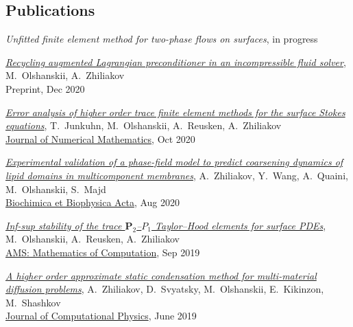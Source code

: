 \documentclass[a4paper,12pt]{article}
\begin{document}
	\subsection*{Publications}
	
	\begin{etaremune}[topsep=0pt]
		\item \textit{Unfitted finite element method for two-phase flows on surfaces}, in progress
		\item \textit{\href{https://arxiv.org/abs/2012.10073}{Recycling augmented Lagrangian preconditioner in an incompressible fluid solver}}, M.~Olshanskii, A.~Zhiliakov\\
		Preprint, Dec 2020
		\item \textit{\href{https://arxiv.org/abs/2003.06972}{Error analysis of higher order trace finite element methods for the surface Stokes equations}}, T.~Junkuhn, M.~Olshanskii, A.~Reusken, A.~Zhiliakov\\
		\href{https://doi.org/10.1515/jnma-2020-0017}{Journal of Numerical Mathematics}, Oct 2020		
		\item \textit{\href{https://arxiv.org/abs/2006.14125}{Experimental validation of a phase-field model to predict coarsening dynamics of lipid domains in multicomponent membranes}}, A.~Zhiliakov, Y.~Wang, A.~Quaini, M.~Olshanskii, S.~Majd\\
		\href{https://doi.org/10.1016/j.bbamem.2020.183446}{Biochimica et Biophysica Acta}, Aug 2020
		\item \textit{\href{https://arxiv.org/abs/1909.02990}{Inf-sup stability of the trace $\mathbf P_2$--$P_1$ Taylor--Hood elements for surface PDEs}}, M.~Olshanskii, A.~Reusken, A.~Zhiliakov\\ \href{https://doi.org/10.1090/mcom/3551}{AMS: Mathematics of Computation}, Sep 2019 
		\item \textit{\href{https://www.researchgate.net/publication/333900759_A_higher_order_approximate_static_condensation_method_for_multi-material_diffusion_problems}{A higher order approximate static condensation method for multi-material diffusion problems}}, A.~Zhiliakov, D.~Svyatsky, M.~Olshanskii, E.~Kikinzon, M.~Shashkov\\ \href{https://doi.org/10.1016/j.jcp.2019.06.044}{Journal of Computational Physics}, June 2019 

\end{etaremune}
\end{document}
